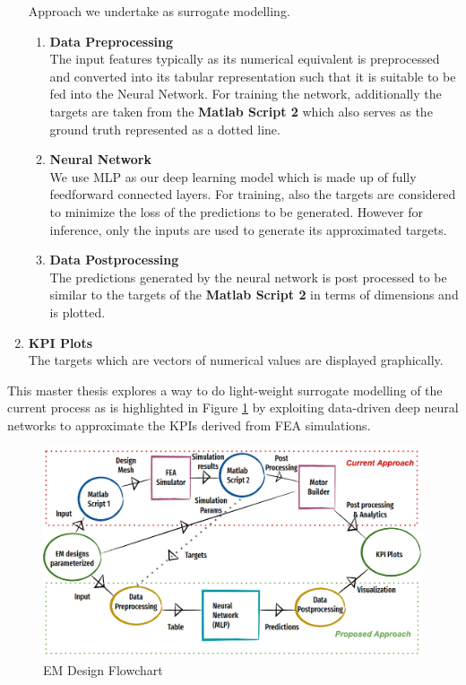 \documentclass{report} %
\begin{document}
\begin{enumerate}
    Approach we undertake as surrogate modelling.
    \begin{enumerate}
        \item \textbf{Data Preprocessing} \\
        The input features typically as its numerical equivalent is preprocessed and converted into its tabular representation such that it is suitable to be fed into the Neural Network.
        For training the network, additionally the targets are taken from the \textbf{Matlab Script 2} which also serves as the ground truth represented as a dotted line.
        \item \textbf{Neural Network} \\
        We use \ac{MLP} as our deep learning model which is made up of fully feedforward connected layers. For training, also the targets are considered to minimize 
        the loss of the predictions to be generated. However for inference, only the inputs are used to generate its approximated targets.
        \item \textbf{Data Postprocessing} \\
        The predictions generated by the neural network is post processed to be similar to the targets of the \textbf{Matlab Script 2} in terms of dimensions and is plotted.
    \end{enumerate}    
    \item \textbf{KPI Plots} \\
    The targets which are vectors of numerical values are displayed graphically.
\end{enumerate}

This master thesis explores a way to do light-weight surrogate modelling of the current process as is highlighted in Figure \ref{fig:EM Design Flowchart} by 
exploiting data-driven deep neural networks to approximate the \ac{KPI}s derived from \ac{FEA} simulations.

\begin{figure}[H]
    \centering
    \includegraphics[width=1\textwidth]{./ReportImages/EM_design_flowchart_v2.png} 
    \caption{\ac{EM} Design Flowchart}
    \label{fig:EM Design Flowchart}
\end{figure}
\end{document}
